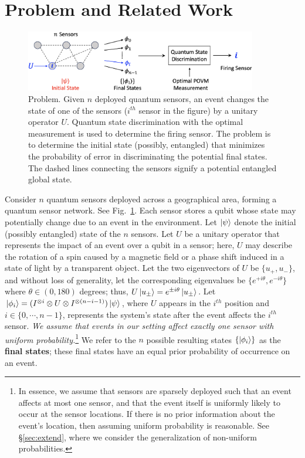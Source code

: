 \section{\iso Problem and Related Work}
\label{sec:tqc_problem}

\begin{figure}[ht]
    \centering
    \includegraphics[width=0.9\textwidth]{chapters/tqc/figures/ISO.png}
    \caption{\iso Problem. Given $n$ deployed quantum sensors, an event changes the state of one of the sensors  ($i^{th}$ sensor in the figure) by a unitary operator $U$. Quantum state discrimination with the optimal measurement is used to determine the firing sensor. The \iso problem is to determine the initial state (possibly, entangled) that minimizes the probability of error in discriminating the potential final states. The dashed lines connecting the sensors signify a potential entangled global state.
    } 
    \label{fig:qsn}
\end{figure}

 Consider $n$ quantum sensors deployed across a geographical area, forming a quantum sensor network. See Fig.~\ref{fig:qsn}. 
Each sensor stores a qubit whose state may potentially change due to an event in the environment.
Let $\ket{\psi}$ denote the initial (possibly entangled) state of the $n$ sensors.
Let $U$ be a unitary operator that represents the impact of an event over a qubit in a sensor;
here, $U$ may describe the rotation of a spin caused by a magnetic field or a phase shift induced in a state of light by a transparent object.
Let the two eigenvectors of $U$ be $\{u_+, u_-\}$, and without loss of generality,
let the corresponding eigenvalues be $\{e^{+i\theta}, e^{-i\theta}\}$
where $\theta \in (0, 180)$ degrees;
thus, $U\ket{u_{\pm}}=e^{\pm i\theta}\ket{u_{\pm}}$.
Let $\ket{\phi_i} = (I^{\otimes i} \otimes U \otimes I^{\otimes (n-i-1)})\ket{\psi}$, 
where $U$ appears in the $i^{th}$ 
position and $i\in \{0, \cdots, n-1 \}$, 
represents the system's state after the event affects the $i^{th}$ sensor. 
{\em We assume that events in our setting affect exactly one sensor with uniform probability.}\footnote{In essence, we assume that sensors are sparsely deployed such that
an event affects at most one sensor, and that the event itself is uniformly likely to occur at the sensor locations. 
If there is no prior information about the event's location, then assuming uniform probability is reasonable.
See \S\ref{sec:extend}, where we consider the generalization of non-uniform probabilities.}
We refer to the $n$ possible resulting states $\{\ket{\phi_i}\}$ as the {\bf final states}; these
final states have an equal prior probability of occurrence on an event.

